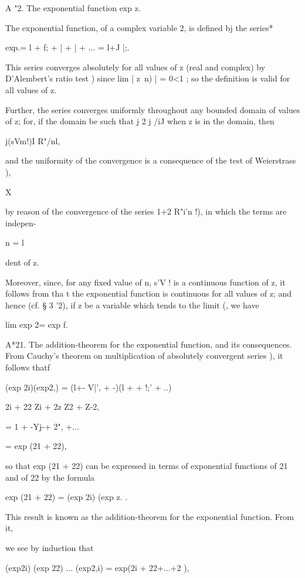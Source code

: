 %
%

A "2. The exponential function exp z.

The exponential function, of a complex variable 2, is defined bj the
series*

exp.= l + f; + | + | + ... = l+J |;.

This series converges absolutely for all values of z (real and
complex) by D'Alembert's ratio test ) since lim | z\ n) | = 0<1
; so the definition is valid for all values of z.

Further, the series converges uniformly throughout any bounded domain
of values of z; for, if the domain be such that j 2 j /iJ when z is
in the domain, then

j(sVm!)I R"/nl,

and the uniformity of the convergence is a consequence of the test of
Weierstrass ),

X

by reason of the convergence of the series 1+2 R"i'n !), in which the
terms are indepen-

n = l

dent of z.

Moreover, since, for any fixed value of n, s'V ! is a continuous
function of z, it follows from  tha t the exponential function
is continuous for all values of z; and hence (cf. § 3 '2), if z be a
variable which tends to the limit (, we have

lim exp 2= exp f.

A*21. The addition-theorem for the exponential function, and its
consequences. From Cauchy's theorem on multiplication of absolutely
convergent series ), it follows thatf

(exp 2i)(exp2,) = (l+- V|', + -)(l + + !;' + ..)

2i + 22 Zi + 2z Z2 + Z-2,

= 1 + -Yj-+ 2", +...

= exp (21 + 22),

so that exp (21 + 22) can be expressed in terms of exponential
functions of 21 and of 22 by the formula

exp (21 + 22) = (exp 2i) (exp z. .

This result is known as the addition-theorem for the exponential
function. From it,

we see by induction that

(exp2i) (exp 22) ... (exp2,i) = exp(2i + 22+...+2 ),

